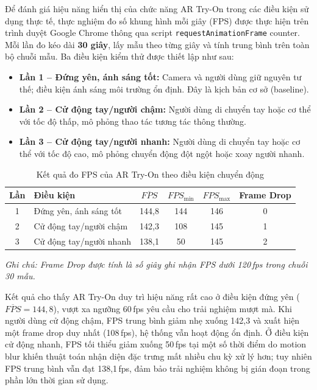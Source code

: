 Để đánh giá hiệu năng hiển thị của chức năng AR Try-On trong các điều
kiện sử dụng thực tế, thực nghiệm đo số khung hình mỗi giây (FPS) được
thực hiện trên trình duyệt Google Chrome thông qua script
\texttt{requestAnimationFrame} counter. Mỗi lần đo kéo dài \textbf{30 giây},
lấy mẫu theo từng giây và tính trung bình trên toàn bộ chuỗi mẫu.
Ba điều kiện kiểm thử được thiết lập như sau:

\begin{itemize}
    \item \textbf{Lần 1 -- Đứng yên, ánh sáng tốt:} Camera và người dùng
    giữ nguyên tư thế; điều kiện ánh sáng môi trường ổn định. Đây là
    kịch bản cơ sở (baseline).
    \item \textbf{Lần 2 -- Cử động tay/người chậm:} Người dùng di chuyển
    tay hoặc cơ thể với tốc độ thấp, mô phỏng thao tác tương tác thông thường.
    \item \textbf{Lần 3 -- Cử động tay/người nhanh:} Người dùng di chuyển
    tay hoặc cơ thể với tốc độ cao, mô phỏng chuyển động đột ngột hoặc
    xoay người nhanh.
\end{itemize}

\begin{table}[H]
\centering
\caption{Kết quả đo FPS của AR Try-On theo điều kiện chuyển động}
\label{tab:ar_fps}
\renewcommand{\arraystretch}{1.5}
\begin{tabular}{|c|p{3.8cm}|c|c|c|c|}
\hline
\textbf{Lần} & \textbf{Điều kiện} &
\textbf{$\overline{FPS}$} & \textbf{$FPS_{\min}$} & \textbf{$FPS_{\max}$} &
\textbf{Frame Drop} \\
\hline
1 & Đứng yên, ánh sáng tốt  & 144{,}8 & 144 & 146 & 0 \\
\hline
2 & Cử động tay/người chậm  & 142{,}3 & 108 & 145 & 1 \\
\hline
3 & Cử động tay/người nhanh & 138{,}1 &  50 & 145 & 2 \\
\hline
\end{tabular}
\end{table}

\textit{Ghi chú: Frame Drop được tính là số giây ghi nhận FPS dưới 120\,fps
trong chuỗi 30 mẫu.}

Kết quả cho thấy AR Try-On duy trì hiệu năng rất cao ở điều kiện đứng yên
($\overline{FPS} = 144{,}8$), vượt xa ngưỡng 60\,fps yêu cầu cho trải nghiệm
mượt mà. Khi người dùng cử động chậm, FPS trung bình giảm nhẹ xuống 142{,}3
và xuất hiện một frame drop duy nhất (108\,fps), hệ thống vẫn hoạt động ổn
định. Ở điều kiện cử động nhanh, FPS tối thiểu giảm xuống 50\,fps tại một
số thời điểm do motion blur khiến thuật toán nhận diện đặc trưng mất nhiều
chu kỳ xử lý hơn; tuy nhiên FPS trung bình vẫn đạt 138{,}1\,fps, đảm bảo
trải nghiệm không bị gián đoạn trong phần lớn thời gian sử dụng.
